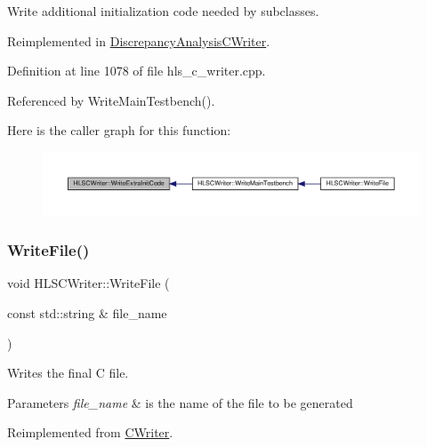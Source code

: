 Write additional initialization code needed by subclasses. 



Reimplemented in \hyperlink{classDiscrepancyAnalysisCWriter_a4372f752e67aea0e47542ee355932da2}{Discrepancy\+Analysis\+C\+Writer}.



Definition at line 1078 of file hls\+\_\+c\+\_\+writer.\+cpp.



Referenced by Write\+Main\+Testbench().

Here is the caller graph for this function\+:
\nopagebreak
\begin{figure}[H]
\begin{center}
\leavevmode
\includegraphics[width=350pt]{d4/db1/classHLSCWriter_a05886037980c7ec5aa2df5880081682c_icgraph}
\end{center}
\end{figure}
\mbox{\label{classHLSCWriter_a5956dd91971c6fca646d0f714afd6795}} 
\subsubsection{\texorpdfstring{Write\+File()}{WriteFile()}}
{\footnotesize\ttfamily void H\+L\+S\+C\+Writer\+::\+Write\+File (\begin{DoxyParamCaption}\item[{const std\+::string \&}]{file\+\_\+name }\end{DoxyParamCaption})\hspace{0.3cm}{\ttfamily [virtual]}}



Writes the final C file. 


\begin{DoxyParams}{Parameters}
{\em file\+\_\+name} & is the name of the file to be generated \\
\hline
\end{DoxyParams}


Reimplemented from \hyperlink{classCWriter_ad526446c6dd856accaca4a90b3a64f25}{C\+Writer}.



